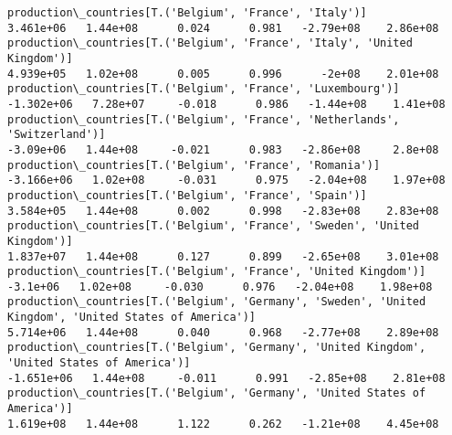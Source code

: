 \documentclass[11pt]{article}
\begin{document}
\begin{Verbatim}[commandchars=\\\{\}]
production\_countries[T.('Belgium', 'France', 'Italy')]                                                                                                                                 3.461e+06   1.44e+08      0.024      0.981   -2.79e+08    2.86e+08
production\_countries[T.('Belgium', 'France', 'Italy', 'United Kingdom')]                                                                                                               4.939e+05   1.02e+08      0.005      0.996      -2e+08    2.01e+08
production\_countries[T.('Belgium', 'France', 'Luxembourg')]                                                                                                                           -1.302e+06   7.28e+07     -0.018      0.986   -1.44e+08    1.41e+08
production\_countries[T.('Belgium', 'France', 'Netherlands', 'Switzerland')]                                                                                                            -3.09e+06   1.44e+08     -0.021      0.983   -2.86e+08     2.8e+08
production\_countries[T.('Belgium', 'France', 'Romania')]                                                                                                                              -3.166e+06   1.02e+08     -0.031      0.975   -2.04e+08    1.97e+08
production\_countries[T.('Belgium', 'France', 'Spain')]                                                                                                                                 3.584e+05   1.44e+08      0.002      0.998   -2.83e+08    2.83e+08
production\_countries[T.('Belgium', 'France', 'Sweden', 'United Kingdom')]                                                                                                              1.837e+07   1.44e+08      0.127      0.899   -2.65e+08    3.01e+08
production\_countries[T.('Belgium', 'France', 'United Kingdom')]                                                                                                                         -3.1e+06   1.02e+08     -0.030      0.976   -2.04e+08    1.98e+08
production\_countries[T.('Belgium', 'Germany', 'Sweden', 'United Kingdom', 'United States of America')]                                                                                 5.714e+06   1.44e+08      0.040      0.968   -2.77e+08    2.89e+08
production\_countries[T.('Belgium', 'Germany', 'United Kingdom', 'United States of America')]                                                                                          -1.651e+06   1.44e+08     -0.011      0.991   -2.85e+08    2.81e+08
production\_countries[T.('Belgium', 'Germany', 'United States of America')]                                                                                                             1.619e+08   1.44e+08      1.122      0.262   -1.21e+08    4.45e+08

\end{Verbatim}
\end{document}
